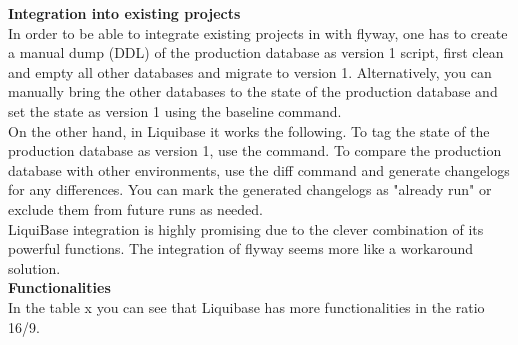 \textbf{Integration into existing projects}\\
In order to be able to integrate existing projects in with flyway, one has to create a manual dump (DDL) of the production database as version 1 script, first clean and empty all other databases and migrate to version 1. Alternatively, you can manually bring the other databases to the state of the production database and set the state as version 1 using the baseline command.\\
On the other hand, in Liquibase it works the following. To tag the state of the production database as version 1, use the  command. To compare the production database with other environments, use the diff command and generate changelogs for any differences. You can mark the generated changelogs as "already run" or exclude them from future runs as needed.\\
LiquiBase integration is highly promising due to the clever combination of its powerful functions. The integration of flyway seems more like a workaround solution.\\

\textbf{Functionalities}\\
In the table x you can see that Liquibase has more functionalities in the ratio 16/9. 



